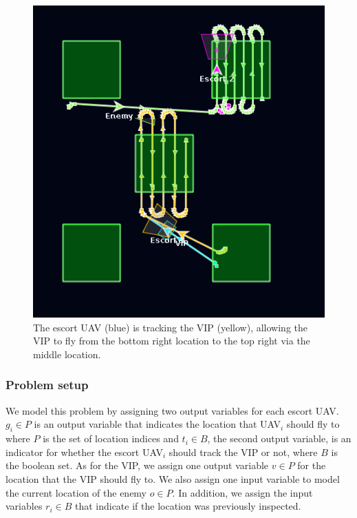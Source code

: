 \documentclass[]{article}
\begin{document}
\begin{figure}[htp]
    \centering
\includegraphics[scale=.4]{figs/vip_escort.pdf}
    \caption{The escort UAV (blue) is tracking the VIP (yellow), allowing the VIP
to fly from the bottom right location to the top right via the middle location.}
    \label{fig:vip}
\end{figure}


\subsubsection{Problem setup}\label{problem-setup}

We model this problem by assigning two output variables for each escort UAV. $g_{i} \in
P$ is an output variable that indicates the location that UAV$_{i}$ should fly to where
$P$ is the set of location indices and $t_{i}\in B$, the second output variable, is an
indicator for whether the escort UAV$_{i}$ should track the VIP or not, where $B$ is the
boolean set. As for the VIP, we assign one output variable $v \in P$ for the location
that the VIP should fly to. We also assign one input variable to model the current
location of the enemy $o \in P$. In addition, we assign the input variables $r_{i} \in
B$ that indicate if the location was previously inspected.
\end{document}
